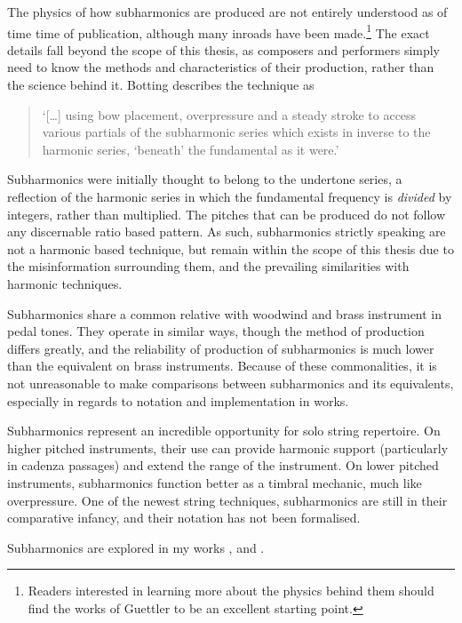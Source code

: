 The physics of how subharmonics are produced are not entirely understood as of time time of publication, although many inroads have been made.\footnote{Readers interested in learning more about the physics behind them should find the works of Guettler to be an excellent starting point.}\autocite[]{guettlerBowedStringDevelopment2002}
The exact details fall beyond the scope of this thesis, as composers and performers simply need to know the methods and characteristics of their production, rather than the science behind it.
Botting describes the technique as \begin{quotation}
  `[\ldots] using bow placement, overpressure and a steady stroke to access various partials of the subharmonic series which exists in inverse to the harmonic series, ‘beneath’ the fundamental as it were.'\autocite[16]{bottingDevelopingPersonalVocabulary2019}
\end{quotation}
Subharmonics were initially thought to belong to the undertone series, a reflection of the harmonic series in which the fundamental frequency is \emph{divided} by integers, rather than multiplied.\autocite[]{shaahinmohajeriEqualdivisionsoflengthEdl240edo2019}
The pitches that can be produced do not follow any discernable ratio based pattern.\autocite[]{guettlerWaveAnalysisString1994}
As such, subharmonics strictly speaking are not a harmonic based technique, but remain within the scope of this thesis due to the misinformation surrounding them, and the prevailing similarities with harmonic techniques.

Subharmonics share a common relative with woodwind and brass instrument in pedal tones.
They operate in similar ways, though the method of production differs greatly, and the reliability of production of subharmonics is much lower than the equivalent on brass instruments.
Because of these commonalities, it is not unreasonable to make comparisons between subharmonics and its equivalents, especially in regards to notation and implementation in works.


Subharmonics represent an incredible opportunity for solo string repertoire. 
On higher pitched instruments, their use can provide harmonic support (particularly in cadenza passages) and extend the range of the instrument. 
On lower pitched instruments, subharmonics function better as a timbral mechanic, much like overpressure. 
One of the newest string techniques, subharmonics are still in their comparative infancy, and their notation has not been formalised. 

Subharmonics are explored in my works , and .


